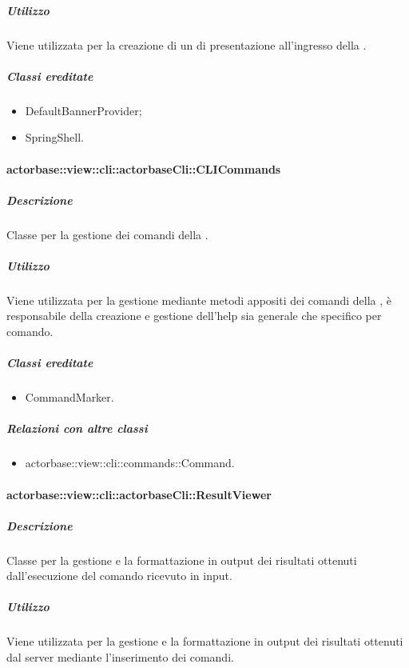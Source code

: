 \documentclass{scalatekids-article}
\begin{document}
\subparagraph{Utilizzo}

Viene utilizzata per la creazione di un  di presentazione all'ingresso della .

\subparagraph{Classi ereditate}

\begin{itemize}
\item DefaultBannerProvider;
\item SpringShell.
\end{itemize}

\paragraph{actorbase::view::cli::actorbaseCli::CLICommands}

\subparagraph{Descrizione}

Classe per la gestione dei comandi della .

\subparagraph{Utilizzo}

Viene utilizzata per la gestione mediante metodi appositi dei comandi della , è responsabile della creazione e gestione dell'help sia generale che specifico per comando.

\subparagraph{Classi ereditate}

\begin{itemize}
\item CommandMarker.
\end{itemize}

\subparagraph{Relazioni con altre classi}

\begin{itemize}
\item actorbase::view::cli::commands::Command.
\end{itemize}

\paragraph{actorbase::view::cli::actorbaseCli::ResultViewer}

\subparagraph{Descrizione}

Classe per la gestione e la formattazione in output dei risultati ottenuti dall'esecuzione del comando ricevuto in input.

\subparagraph{Utilizzo}

Viene utilizzata per la gestione e la formattazione in output dei risultati ottenuti dal server mediante l'inserimento dei comandi.
\end{document}
